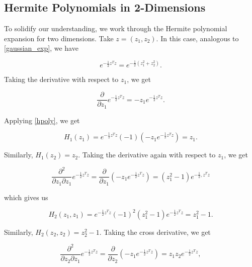 \documentclass[11pt]{article}
\numberwithin{equation}{section}
\begin{document}
\begin{appendix}

\section{Hermite Polynomials in 2-Dimensions} \label{app:hermite2d}

To solidify our understanding, we work through the Hermite polynomial expansion for two dimensions. Take $z = (z_1, z_2)$. In this case, analogous to \eqref{gaussian_exp}, we have

\begin{equation}
e^{-\frac{1}{2} z^T z} = e^{-\frac{1}{2} (z_1^2 + z_2^2)}.
\end{equation}

Taking the derivative with respect to $z_1$, we get

\begin{equation*}
\frac{\partial}{\partial z_1} e^{-\frac{1}{2} z^T z} = -z_1 e^{-\frac{1}{2} z^T z}.
\end{equation*}

Applying \eqref{hpoly}, we get

\begin{equation}
H_1(z_1) = e^{-\frac{1}{2} z^T z} (-1) \left( -z_1 e^{-\frac{1}{2} z^T z} \right) = z_1.
\end{equation}

Similarly, $H_1(z_2) = z_2$. Taking the derivative again with respect to $z_1$, we get

\begin{equation*}
\frac{\partial^2}{\partial z_1 \partial z_1} e^{-\frac{1}{2} z^T z} = \frac{\partial}{\partial z_1} \left( -z_1 e^{-\frac{1}{2} z^T z} \right) = \left( z_1^2 - 1 \right) e^{-\frac{1}{2}, z^T z}
\end{equation*}

which gives us

\begin{equation}
H_2(z_1, z_1) = e^{-\frac{1}{2} z^T z} (-1)^2 (z_1^2 -1) e^{-\frac{1}{2} z^T z} = z_1^2 -1.
\end{equation}

Similarly, $H_2(z_2, z_2) = z_2^2 -1$. Taking the cross derivative, we get

\begin{equation*}
\frac{\partial^2}{\partial z_2 \partial z_1} e^{-\frac{1}{2} z^T z} = \frac{\partial}{\partial z_2} \left( -z_1 e^{-\frac{1}{2} z^T z} \right) =  z_1 z_2  e^{-\frac{1}{2} z^T z},
\end{equation*}


\end{appendix}
\end{document}
